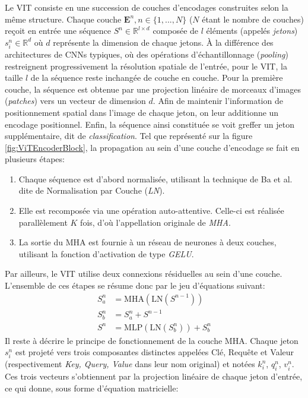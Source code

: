 Le \ac{VIT} consiste en une succession de couches d'encodages construites selon la même structure. Chaque couche $\mathbf{E}^n, n \in \{1,..., N\}$ ($N$ étant le nombre de couches) reçoit en entrée une séquence $S^n \in \mathbb{R}^{l\times d}$ composée de $l$ éléments (appelés \textit{jetons}) $s_i^n \in \mathbb{R}^d$ où $d$ représente la dimension de chaque jetons. À la différence des architectures de \ac{CNN}s typiques, où des opérations d'échantillonnage (\textit{pooling}) restreignent progressivement la résolution spatiale de l'entrée, pour le \ac{VIT}, la taille $l$ de la séquence reste inchangée de couche en couche. Pour la première couche, la séquence est obtenue par une projection linéaire de morceaux d'images (\textit{patches}) vers un vecteur de dimension $d$. Afin de maintenir l'information de positionnement spatial dans l'image de chaque jeton, on leur additionne un encodage positionnel. Enfin, la séquence ainsi constituée se voit greffer un jeton supplémentaire, dit de \textit{classification}.
Tel que représenté sur la figure \ref{fig:ViTEncoderBlock}, la propagation au sein d'une couche d'encodage se fait en plusieurs étapes:
\begin{enumerate}
	\item Chaque séquence est d'abord normalisée, utilisant la technique de Ba et al. \cite{baLayerNormalization2016} dite de \og Normalisation par Couche \fg (\textit{\ac{LN}}).
	\item Elle est recomposée via une opération auto-attentive. Celle-ci est réalisée parallèlement $K$ fois, d'où l'appellation originale de \textit{\ac{MHA}}.
	\item La sortie du MHA est fournie à un réseau de neurones à deux couches, utilisant la fonction d'activation de type \textit{\ac{GELU}}.
\end{enumerate}
Par ailleurs, le \ac{VIT} utilise deux connexions résiduelles au sein d'une couche. L'ensemble de ces étapes se résume donc par le jeu d'équations suivant:
\begin{align}
	S^{n}_{a} &= \text{MHA}(\text{LN}(S^{n-1})) \\ 
	S^{n}_{b} &= S^{n}_{a} + S^{n-1} \\
	S^{n} &= \text{MLP}(\text{LN}(S^{n}_b)) + S^{n}_{b}
\end{align}
Il reste à décrire le principe de fonctionnement de la couche \ac{MHA}. Chaque jeton $s_i^n$ est projeté vers trois composantes distinctes appelées Clé, Requête et Valeur (respectivement \textit{Key, Query, Value} dans leur nom original) et notées $k_i^n$, $q_i^n$, $v_i^n$. Ces trois vecteurs s'obtiennent par la projection linéaire de chaque jeton d'entrée, ce qui donne, sous forme d'équation matricielle:
